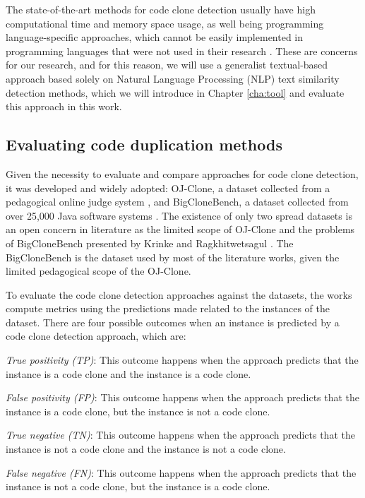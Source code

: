The state-of-the-art methods for code clone detection usually have high computational time and memory space 
usage, as well being programming language-specific approaches, which cannot be easily implemented in programming 
languages that were not used in their research \citep{litreview}. 
These are concerns for our research, and for this reason, we will use a generalist textual-based approach 
based solely on Natural Language Processing (NLP) text similarity detection methods, which we will introduce 
in Chapter \ref{cha:tool} and evaluate this approach in this work.

\subsection{Evaluating code duplication methods}

\label{subsec:codemethods}

Given the necessity to evaluate and compare approaches for code clone detection, it was developed and widely 
adopted: OJ-Clone, a dataset collected from a pedagogical online judge system \citep{ojclone},
and BigCloneBench, a dataset collected from over 25,000 Java software systems \citep{bigclonebench}. 
The existence of only two spread datasets is an open concern in literature as the limited scope of OJ-Clone 
and the problems of BigCloneBench presented by Krinke and Ragkhitwetsagul \citep{bigfail}. The BigCloneBench
is the dataset used by most of the literature works, given the limited pedagogical scope of the OJ-Clone.

To evaluate the code clone detection approaches against the datasets, the works compute metrics using 
the predictions made related to the instances of the dataset. There are four possible outcomes when an 
instance is predicted by a code clone detection approach, which are:

\begin{itemize}
	\begin{item}
		\textit{True positivity (TP)}: This outcome happens when the approach predicts that the instance 
		is a code clone and the instance is a code clone.
	\end{item}
	\begin{item}
		\textit{False positivity (FP)}: This outcome happens when the approach predicts that the instance 
		is a code clone, but the instance is not a code clone.
	\end{item}
		\begin{item}
		\textit{True negative (TN)}: This outcome happens when the approach predicts that the instance 
		is not a code clone and the instance is not a code clone.
	\end{item}
	\begin{item}
		\textit{False negative (FN)}: This outcome happens when the approach predicts that the instance 
		is not a code clone, but the instance is a code clone.
	\end{item}
\end{itemize}

